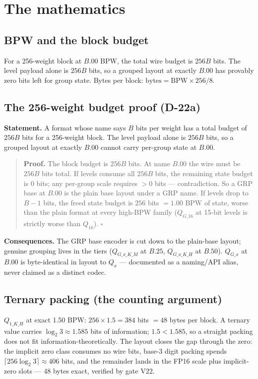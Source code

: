 \chapter{The mathematics}\label{chap:math}

\section{BPW and the block budget}

For a 256-weight block at $B.00$ BPW, the total wire budget is $256B$ bits. The level payload
alone is $256B$ bits, so a grouped layout at exactly $B.00$ has provably zero bits left for
group state. Bytes per block: $\text{bytes} = \mathrm{BPW} \times 256/8$.

\section{The 256-weight budget proof (D-22a)}

\textbf{Statement.} A format whose name says $B$ bits per weight has a total budget of $256B$
bits for a 256-weight block. The level payload alone is $256B$ bits, so a grouped layout at
exactly $B.00$ cannot carry per-group state at $B.00$.

\begin{quote}
\textbf{Proof.} The block budget is $256B$ bits. At name $B.00$ the wire must be $256B$ bits
total. If levels consume all $256B$ bits, the remaining state budget is $0$ bits; any per-group
scale requires $>0$ bits --- contradiction. So a GRP base at $B.00$ is the plain base layout
under a GRP name. If levels drop to $B-1$ bits, the freed state budget is $256$ bits $= 1.00$
BPW of state, worse than the plain format at every high-BPW family ($Q_{G\_16}$ at 15-bit
levels is strictly worse than $Q_{16}$). \hfill$\square$
\end{quote}

\textbf{Consequences.} The GRP base encoder is cut down to the plain-base layout; genuine
grouping lives in the tiers ($Q_{G\_x\_K\_M}$ at $B.25$, $Q_{G\_x\_K\_H}$ at $B.50$).
$Q_{G\_x}$ at $B.00$ is byte-identical in layout to $Q_x$ --- documented as a naming/API alias,
never claimed as a distinct codec.

\section{Ternary packing (the counting argument)}

$Q_{1\_K\_H}$ at exact 1.50 BPW: $256 \times 1.5 = 384$ bits $= 48$ bytes per block. A ternary
value carries $\log_2 3 \approx 1.585$ bits of information; $1.5 < 1.585$, so a straight
packing does not fit information-theoretically. The layout closes the gap through the zero: the
implicit zero class consumes no wire bits, base-3 digit packing spends
$\lceil 256\log_2 3\rceil \approx 406$ bits, and the remainder lands in the FP16 scale plus
implicit-zero slots --- 48 bytes exact, verified by gate V22.


